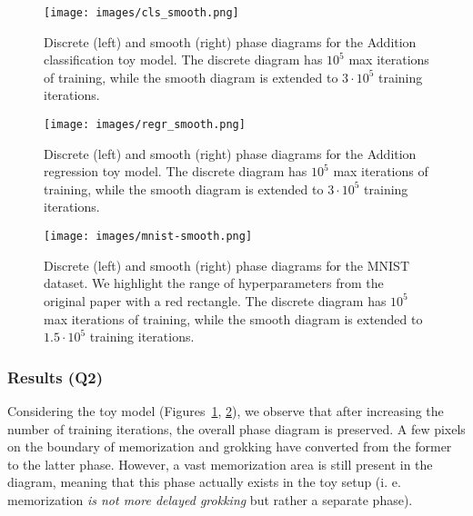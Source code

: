 \begin{figure}[h]
\caption{Discrete (left) and smooth (right) phase diagrams for the Addition classification toy model. The discrete diagram has $10^5$ max iterations of training, while the smooth diagram is extended to $3 \cdot 10^5$ training iterations.}
\centering
\texttt{[image: images/cls\_smooth.png]}
\label{fig:cls-smooth}
\end{figure}

\begin{figure}[h]
\caption{Discrete (left) and smooth (right) phase diagrams for the Addition regression toy model. The discrete diagram has $10^5$ max iterations of training, while the smooth diagram is extended to $3 \cdot 10^5$ training iterations.}
\centering
\texttt{[image: images/regr\_smooth.png]}
\label{fig:regr-smooth}
\end{figure}

\begin{figure}[h]
\caption{Discrete (left) and smooth (right) phase diagrams for the MNIST dataset. We highlight the range of hyperparameters from the original paper with a red rectangle. The discrete diagram has $10^5$ max iterations of training, while the smooth diagram is extended to $1.5 \cdot 10^5$ training iterations.}
\centering
\texttt{[image: images/mnist-smooth.png]}
\label{fig:mnist-smooth}
\end{figure}

\subsubsection{Results (Q2)}
Considering the toy model (Figures~\ref{fig:cls-smooth}, \ref{fig:regr-smooth}), we observe that after increasing the number of training iterations, the overall phase diagram is preserved. A few pixels on the boundary of memorization and grokking have converted from the former to the latter phase. However, a vast memorization area is still present in the diagram, meaning that this phase actually exists in the toy setup (i. e. memorization \emph{is not more delayed grokking} but rather a separate phase).


